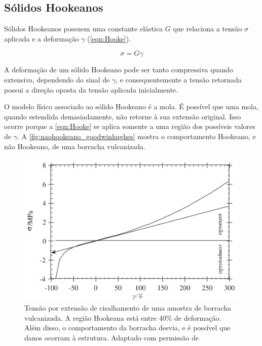 			\subsection{Sólidos Hookeanos}
			
			Sólidos Hookeanos possuem uma constante elástica \(G\) que relaciona a tensão \(\sigma\) aplicada e a deformação \(\gamma\) (\autoref{eqn:Hooke})\cite{Goodwin2008}. 
			
			\begin{equation} 
				\sigma = G\gamma
				\label{eqn:Hooke}
			\end{equation} 
			
			A deformação de um sólido Hookeano pode ser tanto compressiva quando extensiva, dependendo do sinal de \(\gamma\), e consequentemente a tensão retornada possui a direção oposta da tensão aplicada inicialmente. 
			
			O modelo físico associado ao sólido Hookeano é a mola.\cite{Goodwin2008} É possível que uma mola, quando estendida demasiadamente, não retorne à sua extensão original. Isso ocorre porque a \autoref{eqn:Hooke} se aplica somente a uma região dos possíveis valores de \(\gamma\). A \autoref{fig:naohookeano_goodwinhughes} mostra o comportamento Hookeano, e não Hookeano, de uma borracha vulcanizada.
					
			\begin{figure}
				\centering
				\includegraphics[width=0.7\linewidth]{imagens/artigos/nao_hookeano_goodwin_hughes}
				\caption{Tensão por extensão de cisalhamento de uma amostra de borracha vulcanizada. A região Hookeana está entre 40\% de deformação. Além disso, o comportamento da borracha desvia, e é possível que danos ocorram à estrutura. Adaptado com permissão de \citeauthor{Goodwin2008}}
				\label{fig:naohookeano_goodwinhughes}
			\end{figure}

